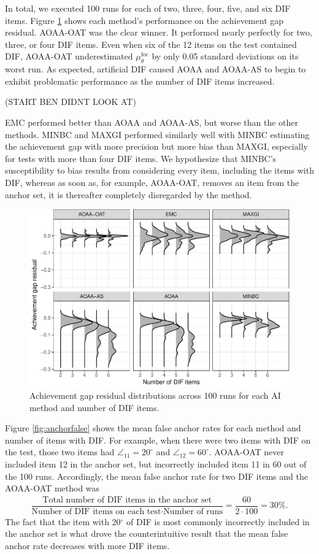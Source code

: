\documentclass[
  11pt,
]{article}
\begin{document}
In total, we executed 100 runs for each of two, three, four, five, and six DIF items. Figure \ref{fig:achievegap} shows each method's performance on the achievement gap residual. AOAA-OAT was the clear winner. It performed nearly perfectly for two, three, or four DIF items. Even when six of the 12 items on the test contained DIF, AOAA-OAT underestimated \(\mu_\theta^\text{foc}\) by only 0.05 standard deviations on its worst run. As expected, artificial DIF caused AOAA and AOAA-AS to begin to exhibit problematic performance as the number of DIF items increased.

(START BEN DIDNT LOOK AT)

EMC performed better than AOAA and AOAA-AS, but worse than the other methods. MINBC and MAXGI performed similarly well with MINBC estimating the achievement gap with more precision but more bias than MAXGI, especially for tests with more than four DIF items. We hypothesize that MINBC's susceptibility to bias results from considering every item, including the items with DIF, whereas as soon as, for example, AOAA-OAT, removes an item from the anchor set, it is thereafter completely disregarded by the method.

\begin{figure}[H]

{\centering \includegraphics[width=0.7\linewidth]{paper_files/figure-latex/achievegap-1} 

}

\caption{Achievement gap residual distributions across 100 runs for each AI method and number of DIF items.}\label{fig:achievegap}
\end{figure}

Figure \ref{fig:anchorfalse} shows the mean false anchor rates for each method and number of items with DIF. For example, when there were two items with DIF on the test, those two items had \(\angle_{11} = 20^\circ\) and \(\angle_{12} = 60^\circ\). AOAA-OAT never included item 12 in the anchor set, but incorrectly included item 11 in 60 out of the 100 runs. Accordingly, the mean false anchor rate for two DIF items and the AOAA-OAT method was
\begin{align}
\dfrac{\text{Total number of DIF items in the anchor set}}{\text{Number of DIF items on each test} \cdot \text{Number of runs}} = \dfrac{60}{2 \cdot 100} = 30\%.
\end{align}
The fact that the item with 20\(^\circ\) of DIF is most commonly incorrectly included in the anchor set is what drove the counterintuitive result that the mean false anchor rate decreases with more DIF items.
\end{document}
